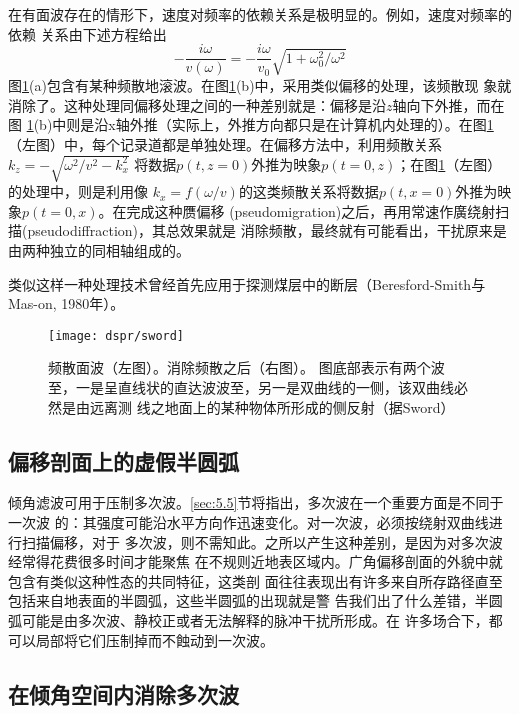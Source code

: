 在有面波存在的情形下，速度对频率的依赖关系是极明显的。例如，速度对频率的依赖
关系由下述方程给出
\begin{equation}
-\frac{i\omega}{v(\omega)}=-\frac{i\omega}{v_0}\sqrt{1+\omega_0^2/\omega^2}
\label{eq:ex4.1.4}
\end{equation}
图\ref{fig:dspr/sword}(a)包含有某种频散地滚波。在图\ref{fig:dspr/sword}(b)中，采用类似偏移的处理，该频散现
象就消除了。这种处理同偏移处理之间的一种差别就是：偏移是沿$z$轴向下外推，而在图
\ref{fig:dspr/sword}(b)中则是沿x轴外推（实际上，外推方向都只是在计算机内处理的）。在图\ref{fig:dspr/sword}
（左图）中，每个记录道都是单独处理。在偏移方法中，利用频散关系$k_z=-\sqrt{\omega^2/v^2-k_x^2}$
将数据$p(t,z=0)$外推为映象$p(t=0,z)$；在图\ref{fig:dspr/sword}（左图）的处理中，则是利用像
$k_x=f(\omega/v)$的这类频散关系将数据$p(t,x=0)$外推为映象$p(t=0,x)$。在完成这种赝偏移
(pseudomigration)之后，再用常速作廣绕射扫描(pseudodiffraction)，其总效果就是
消除频散，最终就有可能看出，干扰原来是由两种独立的同相轴组成的。

类似这样一种处理技术曾经首先应用于探测煤层中的断层（Beresford-Smith与Mas-on, 1980年）。

\begin{figure}[H]
\centering
\texttt{[image: dspr/sword]}
\caption[sword]{频散面波（左图）。消除频散之后（右图）。
图底部表示有两个波至，一是呈直线状的直达波波至，另一是双曲线的一侧，该双曲线必然是由远离测
线之地面上的某种物体所形成的侧反射（据Sword）}
\label{fig:dspr/sword}
\end{figure}

\subsection{偏移剖面上的虚假半圆弧}
\label{sec:4.1.6}

倾角滤波可用于压制多次波。\ref{sec:5.5}节将指出，多次波在一个重要方面是不同于一次波
的：其强度可能沿水平方向作迅速变化。对一次波，必须按绕射双曲线进行扫描偏移，对于
多次波，则不需知此。之所以产生这种差别，是因为对多次波经常得花费很多时间才能聚焦
在不规则近地表区域内。广角偏移剖面的外貌中就包含有类似这种性态的共同特征，这类剖
面往往表现出有许多来自所存路径直至包括来自地表面的半圆弧，这些半圆弧的出现就是警
告我们出了什么差错，半圆弧可能是由多次波、静校正或者无法解释的脉冲干扰所形成。在
许多场合下，都可以局部将它们压制掉而不蝕动到一次波。

\subsection{在倾角空间内消除多次波}
\label{sec:4.1.7}

